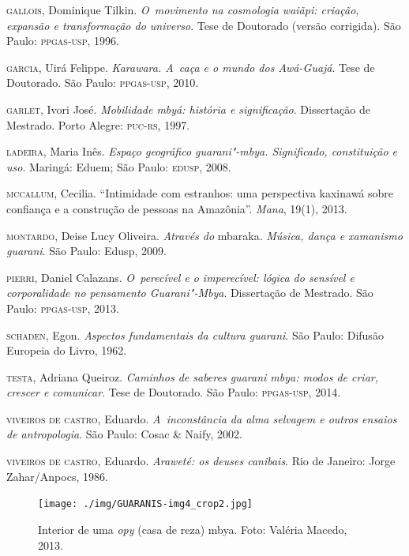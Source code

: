 \begin{Parskip}
\textsc{gallois}, Dominique Tilkin. \emph{O~movimento na cosmologia waiãpi:
criação, expansão e transformação do universo}. Tese de Doutorado
(versão corrigida). São Paulo: \textsc{ppgas}-\textsc{usp}, 1996.

\textsc{garcia}, Uirá Felippe. \emph{Karawara. A~caça e o mundo dos Awá-Guajá}.
Tese de Doutorado. São Paulo: \textsc{ppgas}-\textsc{usp}, 2010.

\textsc{garlet}, Ivori José. \emph{Mobilidade mbyá: história e significação}.
Dissertação de Mestrado. Porto Alegre: \textsc{puc}-\textsc{rs}, 1997.

\textsc{ladeira}, Maria Inês. \emph{Espaço geográfico guarani"-mbya. Significado,
constituição e uso}. Maringá: Eduem; São Paulo: \textsc{edusp}, 2008.

\textsc{mccallum}, Cecilia. ``Intimidade com estranhos: uma perspectiva
kaxinawá sobre confiança e a construção de pessoas na Amazônia''. \emph{Mana},
19(1), 2013.

\textsc{montardo}, Deise Lucy Oliveira. \emph{Através do} mbaraka. \emph{Música, dança e
xamanismo guarani}. São Paulo: Edusp, 2009.

\textsc{pierri}, Daniel Calazans. \emph{O~perecível e o imperecível: lógica do
sensível e corporalidade no pensamento Guarani"-Mbya}. Dissertação de
Mestrado. São Paulo: \textsc{ppgas}-\textsc{usp}, 2013.

\textsc{schaden}, Egon. \emph{Aspectos fundamentais da cultura guarani}. São
Paulo: Difusão Europeia do Livro, 1962.

\textsc{testa}, Adriana Queiroz. \emph{Caminhos de saberes guarani mbya: modos de
criar, crescer e comunicar}. Tese de Doutorado. São Paulo: \textsc{ppgas}-\textsc{usp},
2014.

\textsc{viveiros de castro}, Eduardo. \emph{A~inconstância da alma selvagem e
outros ensaios de antropologia}. São Paulo: Cosac \& Naify, 2002.

\textsc{viveiros de castro}, Eduardo. \emph{Araweté: os deuses canibais}. Rio de
Janeiro: Jorge Zahar/Anpocs, 1986.

\end{Parskip}

\pagebreak

\begin{absolutelynopagebreak}
\begin{vplace}
\begin{figure}[H]
\begin{adjustwidth}{-2.7cm}{} 
  \vspace{-3.1cm}
 \texttt{[image: ./img/GUARANIS-img4\_crop2.jpg]}	
\end{adjustwidth}
  \caption{Interior de uma \emph{opy} (casa de reza) mbya. Foto: Valéria Macedo, 2013.}
\end{figure}
\end{vplace}

\thispagestyle{empty}
\end{absolutelynopagebreak}

